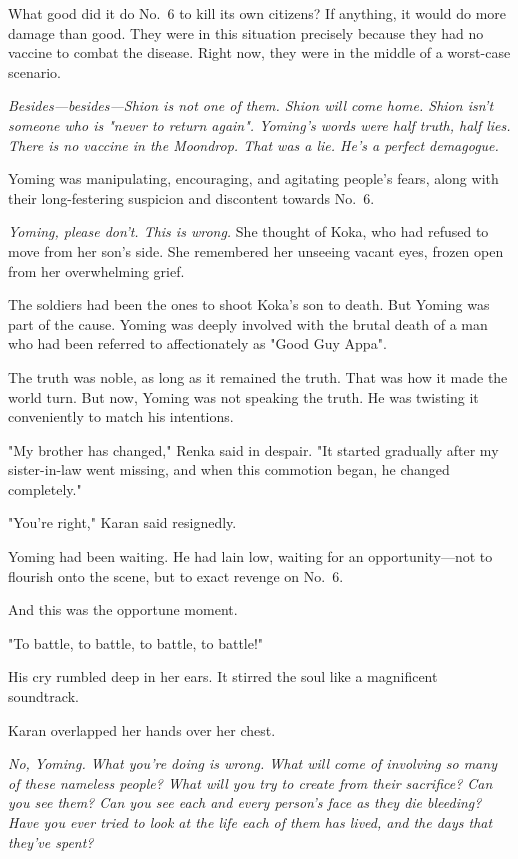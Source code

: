 What good did it do No.~6 to kill its own citizens? If anything, it
would do more damage than good. They were in this situation precisely
because they had no vaccine to combat the disease. Right now, they were
in the middle of a worst-case scenario.

\emph{Besides---besides---Shion is not one of them. Shion will come home. Shion
isn't someone who is "never to return again". Yoming's words were half
truth, half lies. There is no vaccine in the Moondrop. That was a lie.
He's a perfect demagogue.}

Yoming was manipulating, encouraging, and agitating people's fears,
along with their long-festering suspicion and discontent towards No.~6.

\emph{Yoming, please don't. This is wrong.} She thought of Koka, who had
refused to move from her son's side. She remembered her unseeing vacant
eyes, frozen open from her overwhelming grief.

The soldiers had been the ones to shoot Koka's son to death. But Yoming
was part of the cause. Yoming was deeply involved with the brutal death
of a man who had been referred to affectionately as "Good Guy Appa".

The truth was noble, as long as it remained the truth. That was how it
made the world turn. But now, Yoming was not speaking the truth. He was
twisting it conveniently to match his intentions.

"My brother has changed," Renka said in despair. "It started gradually
after my sister-in-law went missing, and when this commotion began, he
changed completely."

"You're right," Karan said resignedly.

Yoming had been waiting. He had lain low, waiting for an opportunity---not
to flourish onto the scene, but to exact revenge on No.~6.

And this was the opportune moment.

"To battle, to battle, to battle, to battle!"

His cry rumbled deep in her ears. It stirred the soul like a magnificent
soundtrack.

Karan overlapped her hands over her chest.

\emph{No, Yoming. What you're doing is wrong. What will come of involving so
many of these nameless people? What will you try to create from their
sacrifice? Can you see them? Can you see each and every person's face as
they die bleeding? Have you ever tried to look at the life each of them
has lived, and the days that they've spent?}

